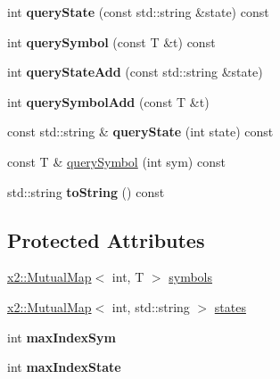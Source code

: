 \begin{DoxyCompactItemize}
int {\bfseries query\+State} (const std\+::string \&state) const
\item 
\mbox{\label{classx2_1_1_finite_automata_manager_a041ba77cdab1d0a1a8e913001c0d20e4}} 
int {\bfseries query\+Symbol} (const T \&t) const
\item 
\mbox{\label{classx2_1_1_finite_automata_manager_a10723c23e08ee15acd6eb80d494fefe6}} 
int {\bfseries query\+State\+Add} (const std\+::string \&state)
\item 
\mbox{\label{classx2_1_1_finite_automata_manager_af85414dd60f2d1d5e7325cc745bcc9cd}} 
int {\bfseries query\+Symbol\+Add} (const T \&t)
\item 
\mbox{\label{classx2_1_1_finite_automata_manager_a216b02d710030768eca71d96c757394e}} 
const std\+::string \& {\bfseries query\+State} (int state) const
\item 
const T \& \hyperlink{classx2_1_1_finite_automata_manager_a86be4353e0fca67243a2a397bb289966}{query\+Symbol} (int sym) const
\item 
\mbox{\label{classx2_1_1_finite_automata_manager_a0a8379981cef571c5e3da4eee3876b13}} 
std\+::string {\bfseries to\+String} () const
\end{DoxyCompactItemize}
\subsection*{Protected Attributes}
\begin{DoxyCompactItemize}
\item 
\hyperlink{classx2_1_1_mutual_map}{x2\+::\+Mutual\+Map}$<$ int, T $>$ \hyperlink{classx2_1_1_finite_automata_manager_ae0f30598da4c83462fb78d93a3878f4a}{symbols}
\item 
\hyperlink{classx2_1_1_mutual_map}{x2\+::\+Mutual\+Map}$<$ int, std\+::string $>$ \hyperlink{classx2_1_1_finite_automata_manager_a54a0b0aba6cf5b0d1e04dd966e7c83fc}{states}
\item 
\mbox{\label{classx2_1_1_finite_automata_manager_a5a305ca8e9e7b2f245f69ad491435e36}} 
int {\bfseries max\+Index\+Sym}
\item 
\mbox{\label{classx2_1_1_finite_automata_manager_a87bc737c79a43e42844d125a0cae638b}} 
int {\bfseries max\+Index\+State}
\end{DoxyCompactItemize}
